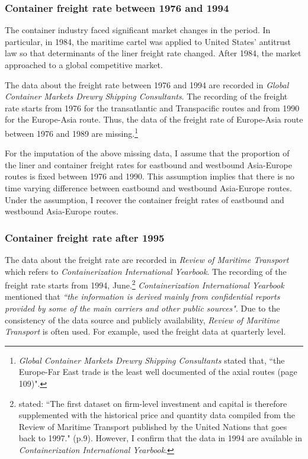 \subsubsection{Container freight rate between 1976 and 1994}

The container industry faced significant market changes in the period. In particular, in 1984, the maritime cartel was applied to United States' antitrust law so that determinants of the liner freight rate changed. After 1984, the market approached to a global competitive market. 

The data about the freight rate between 1976 and 1994 are recorded in \textit{Global Container Markets Drewry Shipping Consultants}. The recording of the freight rate starts from 1976 for the transatlantic and Transpacific routes and from 1990 for the Europe-Asia route. Thus, the data of the freight rate of Europe-Asia route between 1976 and 1989 are missing.\footnote{\textit{Global Container Markets Drewry Shipping Consultants} stated that, ``the Europe-Far East trade is the least well documented of the axial routes (page 109)".} 

For the imputation of the above missing data, I assume that the proportion of the liner and container freight rates for eastbound and westbound Asia-Europe routes is fixed between 1976 and 1990. This assumption implies that there is no time varying difference between eastbound and westbound Asia-Europe routes. Under the assumption, I recover the container freight rates of eastbound and westbound Asia-Europe routes.



\subsubsection{Container freight rate after 1995}\label{subsec:freight_rate_after_1995}

The data about the freight rate are recorded in \textit{Review of Maritime Transport} which refers to \textit{Containerization International Yearbook}. The recording of the freight rate starts from 1994, June.\footnote{\cite{jeon2022learning} stated: ``The first dataset on firm-level investment and capital is therefore supplemented with the historical price and quantity data compiled from the Review of Maritime Transport published by the United Nations that goes back to 1997." (p.9). However, I confirm that the data in 1994 are available in \textit{Containerization International Yearbook}.} \textit{Containerization International Yearbook} mentioned that \textit{``the information is derived mainly from confidential reports provided by some of the main carriers and other public sources"}. Due to the consistency of the data source and publicly availability, \textit{Review of Maritime Transport} is often used. For example, \cite{jeon2022learning} used the freight data at quarterly level.


